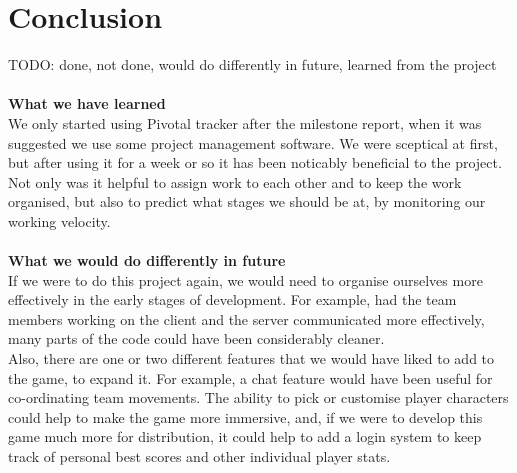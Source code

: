 \documentclass{article}
\begin{document}
\section{Conclusion}
TODO: done, not done, would do differently in future, learned from the project \\ \\
\textbf{What we have learned} \\
We only started using Pivotal tracker after the milestone report, when it was suggested we use some project management software. We were sceptical at first, but after using it for a week or so it has been noticably beneficial to the project. Not only was it helpful to assign work to each other and to keep the work organised, but also to predict what stages we should be at, by monitoring our working velocity. \\ \\
\textbf{What we would do differently in future} \\
If we were to do this project again, we would need to organise ourselves more effectively in the early stages of development. For example, had the team members working on the client and the server communicated more effectively, many parts of the code could have been considerably cleaner. \\
Also, there are one or two different features that we would have liked to add to the game, to expand it. For example, a chat feature would have been useful for co-ordinating team movements. The ability to pick or customise player characters could help to make the game more immersive, and, if we were to develop this game much more for distribution, it could help to add a login system to keep track of personal best scores and other individual player stats.
\end{document}
